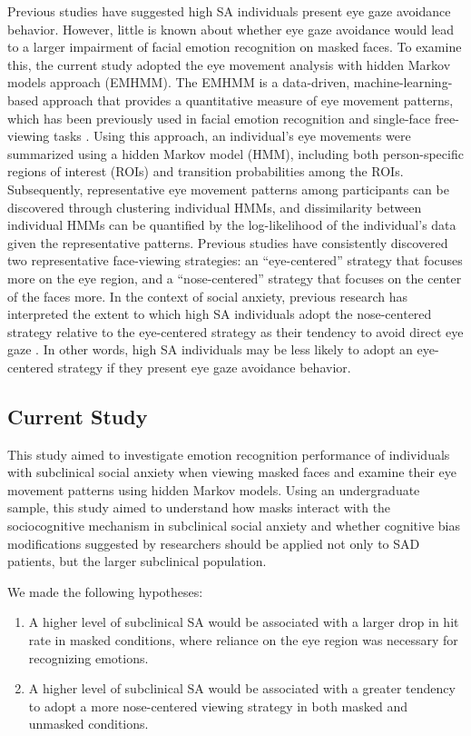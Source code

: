 Previous studies have suggested high SA individuals present eye gaze avoidance behavior. However, little is known about whether eye gaze avoidance would lead to a larger impairment of facial emotion recognition on masked faces. To examine this, the current study adopted the eye movement analysis with hidden Markov models approach (EMHMM). The EMHMM is a data-driven, machine-learning-based approach that provides a quantitative measure of eye movement patterns, which has been previously used in facial emotion recognition \citep{zheng2023differential} and single-face free-viewing tasks \citep{Chan16112020}. Using this approach, an individual’s eye movements were summarized using a hidden Markov model (HMM), including both person-specific regions of interest (ROIs) and transition probabilities among the ROIs. Subsequently, representative eye movement patterns among participants can be discovered through clustering individual HMMs, and dissimilarity between individual HMMs can be quantified by the log-likelihood of the individual’s data given the representative patterns. Previous studies have consistently discovered two representative face-viewing strategies: an “eye-centered” strategy that focuses more on the eye region, and a “nose-centered” strategy that focuses on the center of the faces more. In the context of social anxiety, previous research has interpreted the extent to which high SA individuals adopt the nose-centered strategy relative to the eye-centered strategy as their tendency to avoid direct eye gaze \citep{Chan16112020}. In other words, high SA individuals may be less likely to adopt an eye-centered strategy if they present eye gaze avoidance behavior.
\subsection{Current Study}
This study aimed to investigate emotion recognition performance of individuals with subclinical social anxiety when viewing masked faces and examine their eye movement patterns using hidden Markov models. Using an undergraduate sample, this study aimed to understand how masks interact with the sociocognitive mechanism in subclinical social anxiety and whether cognitive bias modifications suggested by researchers should be applied not only to SAD patients, but the larger subclinical population.

We made the following hypotheses:
\begin{enumerate}
\item A higher level of subclinical SA would be associated with a larger drop in hit rate in masked conditions, where reliance on the eye region was necessary for recognizing emotions.
\item A higher level of subclinical SA would be associated with a greater tendency to adopt a more nose-centered viewing strategy in both masked and unmasked conditions.
\end{enumerate}
